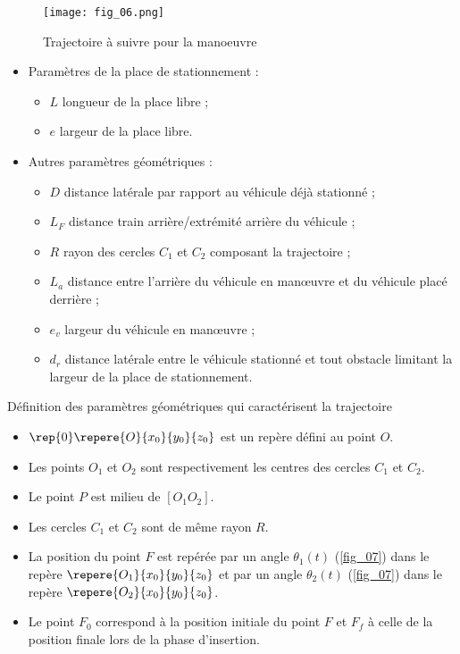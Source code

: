 \begin{figure}[H]
\centering
\texttt{[image: fig\_06.png]}
\caption{Trajectoire à suivre pour la manoeuvre \label{fig_06}}
\end{figure}

\begin{table}
\begin{itemize}
\item Paramètres de la place de stationnement :
\begin{itemize}
\item $L$ longueur de la place libre ;
\item $e$ largeur de la place libre.
\end{itemize}
\item Autres paramètres géométriques :
\begin{itemize}
\item $D$ distance latérale par rapport au véhicule déjà stationné ;
\item $L_F$ distance train arrière/extrémité arrière du véhicule ;
\item $R$ rayon des cercles $C_1$ et $C_2$ composant la trajectoire ;
\item $L_a$ distance entre l’arrière du véhicule en manœuvre et du véhicule placé derrière ;
\item $e_v$ largeur du véhicule en manœuvre ;
\item $d_r$ distance latérale entre le véhicule stationné et tout obstacle limitant la largeur de la place de stationnement.
\end{itemize}
\end{itemize}
\caption{Définition des paramètres géométriques qui caractérisent la trajectoire \label{tab_01}}
\end{table}

\begin{itemize}
\item $\rep{0} \repere{O}{x_0}{y_0}{z_0}$ est un repère défini au point $O$. 
\item Les points $O_1$ et $O_2$ sont respectivement les centres des cercles $C_1$ et $C_2$.
\item Le point $P$ est milieu de $[O_1 O_2]$.
\item Les cercles $C_1$ et $C_2$ sont de même rayon $R$.
\item La position du point $F$ est repérée par un angle $\theta_1(t)$ (\autoref{fig_07}) dans le repère
$\repere{O_1}{x_0}{y_0}{z_0}$ et par un angle $\theta_2(t)$ (\autoref{fig_07}) dans le repère $\repere{O_2}{x_0}{y_0}{z_0}$.
\item Le point $F_0$ correspond à la position initiale du point $F$ et $F_f$ à celle de la position finale lors de la phase d’insertion.
\end{itemize}



